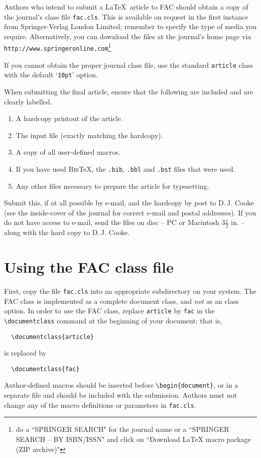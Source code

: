 \documentclass{fac}
\begin{document}
Authors who intend to submit a \LaTeX\ article to FAC should obtain a
copy of the journal's class file \verb"fac.cls". This is available on
request in the first instance from Springer-Verlag London Limited; remember to
specify the type of media you require. Alternatively, you can download
the files at the journal's home page via
\texttt{http://www.springeronline.com}\footnote{do a ``\textsf{SPRINGER
SEARCH}" for the journal name or a ``\textsf{SPRINGER SEARCH -- BY ISBN/ISSN}"
and click on ``\textsf{Download LaTeX macro package (ZIP archive)}"}

If you cannot obtain the proper journal class file, use the standard
\verb"article" class with the default `\verb"10pt"' option.

When submitting the final article, ensure that  the following are included and
are clearly labelled.
\begin{enumerate}
  \item A hardcopy printout of the article.
  \item The input file (exactly matching the hardcopy).
  \item A copy of all user-defined macros.
  \item If you have used \textsc{Bib}\TeX, the \verb".bib", \verb".bbl"
        and \verb".bst" files that were used.
  \item Any other files necessary to prepare the article for typesetting.
\end{enumerate}
Submit this, if at all possible by e-mail, and the hardcopy by post
to D.\,J. Cooke (see the inside-cover of the journal for correct e-mail
and postal addresses). If you do not have access to e-mail, send the files
on disc -- PC or Macintosh $3\frac{1}{2}$ in. -- along with the hard copy
to D.\,J. Cooke.

\section{Using the FAC class file}

First, copy the file \verb"fac.cls" into an appropriate subdirectory on
your system. The FAC class is implemented as a complete document class,
and \emph{not} as an class option.
In order to use the FAC class, replace \verb"article" by \verb"fac" in the
\verb"\documentclass" command at the beginning of your document: that is,
%
\begin{verbatim}
  \documentclass{article}
\end{verbatim}
%
is replaced by
%
\begin{verbatim}
  \documentclass{fac}
\end{verbatim}
%
Author-defined macros should be inserted before \verb"\begin{document}",
or in a separate file and should be included with the submission.
Authors must not change any of the macro definitions or parameters
in \verb"fac.cls".
\end{document}

